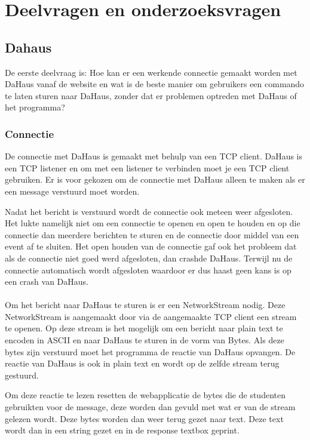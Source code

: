 \documentclass[11pt]{article}
\begin{document}
	\newpage
	
	\section{Deelvragen en onderzoeksvragen}
	\subsection{Dahaus}
	De eerste deelvraag is: Hoe kan er een werkende connectie gemaakt worden met DaHaus vanaf de website en wat is de beste manier om gebruikers een commando te laten sturen naar DaHaus, zonder dat er problemen optreden met DaHaus of het programma? 
	\subsubsection{Connectie}
	
	De connectie met DaHaus is gemaakt met behulp van een TCP client. DaHaus is een TCP listener en om met een listener te verbinden moet je een TCP client gebruiken. Er is voor gekozen om de connectie met DaHaus alleen te maken als er een message verstuurd moet worden.
	
	Nadat het bericht is verstuurd wordt de connectie ook meteen weer afgesloten. Het lukte namelijk niet om een connectie te openen en open te houden en op die connectie dan meerdere berichten te sturen en de connectie door middel van een event af te sluiten. Het open houden van de connectie gaf ook het probleem dat als de connectie niet goed werd afgesloten, dan crashde DaHaus. Terwijl nu de connectie automatisch wordt afgesloten waardoor er dus haast geen kans is op een crash van DaHaus.
	\\
	\\
	Om het bericht naar DaHaus te sturen is er een NetworkStream nodig.
	Deze NetworkStream is aangemaakt door via de aangemaakte TCP client een stream te openen. Op deze stream is het mogelijk om een bericht naar plain text te encoden in ASCII en naar DaHaus te sturen in de vorm van Bytes. Als deze bytes zijn verstuurd moet het programma de reactie van DaHaus opvangen. De reactie van DaHaus is ook in plain text en wordt op de zelfde stream terug gestuurd.
	
	Om deze reactie te lezen resetten de webapplicatie de bytes die de studenten gebruikten voor de message, deze worden dan gevuld met wat er van de stream gelezen wordt. Deze bytes worden dan weer terug gezet naar text. Deze text wordt dan in een string gezet en in de response textbox geprint. 
	
\end{document}
